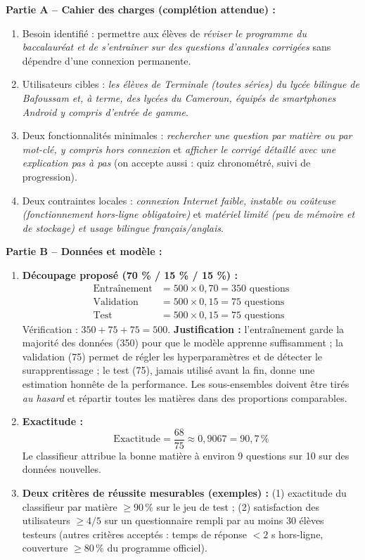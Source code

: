 \documentclass[11pt]{article}
\begin{document}
\begin{corrige}
\textbf{Partie A -- Cahier des charges (complétion attendue) :}
\begin{enumerate}
\item Besoin identifié : permettre aux élèves de \emph{réviser le programme du baccalauréat et de s'entraîner sur des questions d'annales corrigées} sans dépendre d'une connexion permanente.
\item Utilisateurs cibles : \emph{les élèves de Terminale (toutes séries) du lycée bilingue de Bafoussam et, à terme, des lycées du Cameroun, équipés de smartphones Android y compris d'entrée de gamme}.
\item Deux fonctionnalités minimales : \emph{rechercher une question par matière ou par mot-clé, y compris hors connexion} et \emph{afficher le corrigé détaillé avec une explication pas à pas} (on accepte aussi : quiz chronométré, suivi de progression).
\item Deux contraintes locales : \emph{connexion Internet faible, instable ou coûteuse (fonctionnement hors-ligne obligatoire)} et \emph{matériel limité (peu de mémoire et de stockage) et usage bilingue français/anglais}.
\end{enumerate}

\textbf{Partie B -- Données et modèle :}
\begin{enumerate}
\item \textbf{Découpage proposé (70 \% / 15 \% / 15 \%) :}
\begin{align*}
\text{Entraînement} &= 500 \times 0,70 = 350 \text{ questions}\\
\text{Validation} &= 500 \times 0,15 = 75 \text{ questions}\\
\text{Test} &= 500 \times 0,15 = 75 \text{ questions}
\end{align*}
Vérification : $350 + 75 + 75 = 500$. \textbf{Justification :} l'entraînement garde la majorité des données (350) pour que le modèle apprenne suffisamment ; la validation (75) permet de régler les hyperparamètres et de détecter le surapprentissage ; le test (75), jamais utilisé avant la fin, donne une estimation honnête de la performance. Les sous-ensembles doivent être tirés \emph{au hasard} et répartir toutes les matières dans des proportions comparables.
\item \textbf{Exactitude :}
\[ \text{Exactitude} = \frac{68}{75} \approx 0,9067 = 90,7\,\% \]
Le classifieur attribue la bonne matière à environ 9 questions sur 10 sur des données nouvelles.
\item \textbf{Deux critères de réussite mesurables (exemples) :} (1) exactitude du classifieur par matière $\geq 90\,\%$ sur le jeu de test ; (2) satisfaction des utilisateurs $\geq 4/5$ sur un questionnaire rempli par au moins 30 élèves testeurs (autres critères acceptés : temps de réponse $< 2$ s hors-ligne, couverture $\geq 80\,\%$ du programme officiel).
\end{enumerate}


\end{corrige}
\end{document}
